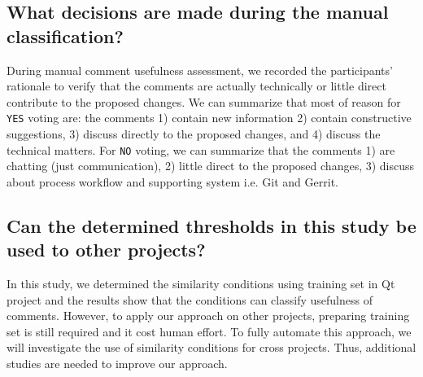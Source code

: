 \subsection{What decisions are made during the manual classification?}
During manual comment usefulness assessment, we recorded the participants' rationale to verify that the comments are actually technically or little direct contribute to the proposed changes. We can summarize that most of reason for \texttt{YES} voting are: the comments 1) contain new information 2) contain constructive suggestions, 3) discuss directly to the proposed changes, and 4) discuss the technical matters. For \texttt{NO} voting, we can summarize that the comments 1) are chatting (just communication), 2) little direct to the proposed changes, 3) discuss about process workflow and supporting system i.e. Git and Gerrit.
%
%
%

\subsection{Can the determined thresholds in this study be used to other projects?} 
In this study, we determined the similarity conditions using training set in Qt project and the results show that the conditions can classify usefulness of comments. However, to apply our approach on other projects, preparing training set is still required and it cost human effort. To fully automate this approach, we will investigate the use of similarity conditions for cross projects. Thus, additional studies are needed to improve our approach. 

